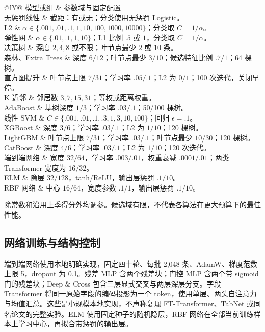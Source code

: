 \documentclass[12pt,journal,onecolumn,a4paper]{IEEEtran}
\newcommand{\tabnote}[1]{\par\vspace{2pt}\begin{minipage}{\linewidth}\footnotesize #1\end{minipage}}
\newcommand{\inlinetab}[1]{\begin{table}[!htbp]\centering\small #1\end{table}}
\begin{document}
\inlinetab{\label{tab:expanded-spaces}
\begin{tabularx}{\linewidth}{@{}lY@{}}\toprule
模型或组 & 参数域与固定配置\\\midrule
无惩罚线性 & 截距：有或无；分类使用无惩罚 Logistic。\\
L2 & $\alpha\in\{.001,.01,.1,1,10,100,1000,10000\}$；分类取 $C=1/\alpha$。\\
弹性网 & $\alpha\in\{.01,.1,1,10\}$；L1 比例 $.5$ 或 $1$，分类取 $C=1/\alpha$。\\
决策树 & 深度 $2,4,8$ 或不限；叶节点最少 $2$ 或 $10$ 条。\\
森林、Extra Trees & 深度 $6/12$；叶节点最少 $3/10$；候选特征比例 $.7/1$；64 棵树。\\
直方图提升 & 叶节点上限 $7/31$；学习率 $.05/.1$；L2 为 $0/1$；100 次迭代，关闭早停。\\
K 近邻 & 邻居数 $3,7,15,31$；等权或距离权重。\\
AdaBoost & 基树深度 $1/3$；学习率 $.03/.1$；50/100 棵树。\\
线性 SVM & $C\in\{.001,.01,.1,.3,1,3,10,100\}$；回归 $\epsilon=.1$。\\
XGBoost & 深度 $3/6$；学习率 $.03/.1$；L2 为 $1/10$；120 棵树。\\
LightGBM & 叶节点上限 $7/31$；学习率 $.03/.1$；叶节点最少 $10/30$；120 棵树。\\
CatBoost & 深度 $4/6$；学习率 $.03/.1$；L2 为 $1/10$；120 次迭代。\\
端到端网络 & 宽度 $32/64$，学习率 $.003/.01$，权重衰减 $.0001/.01$；两类 Transformer 宽度为 $16/32$。\\
ELM & 隐层 $32/128$，tanh/ReLU，输出层惩罚 $.1/10$。\\
RBF 网络 & 中心 $16/64$，宽度参数 $.1/1$，输出层惩罚 $.1/10$。\\\bottomrule
\end{tabularx}\tabnote{除常数和沿用上季得分外均调参。候选域有限，不代表各算法在更大预算下的最佳性能。}} 

\subsection{网络训练与结构控制}
端到端网络使用本地明确实现，固定四十轮、每批 2,048 条、AdamW、梯度范数上限 5，dropout 为 0.1。残差 MLP 含两个残差块；门控 MLP 含两个带 sigmoid 门的残差块；Deep \& Cross 包含三层显式交叉与两层深层分支\citep{dcn2017}。字段 Transformer 将同一原始字段的编码投影为一个 token，使用单层、两头自注意力与均值汇总\citep{transformer2017}。这些是小规模本地实现，不声称复现 FT-Transformer、TabNet 或同名论文的完整实验。ELM 使用固定种子的随机隐层，RBF 网络在全部当前训练样本上学习中心，再拟合带惩罚的输出层。
\end{document}
